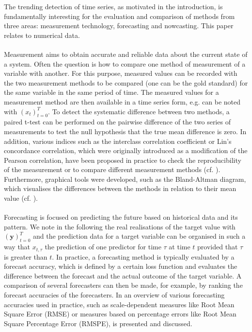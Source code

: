 The trending detection of time series, as motivated in the introduction, is fundamentally interesting for the evaluation and comparison of methods from three areas: measurement technology, forecasting and nowcasting. This paper relates to numerical data.\\\\
Measurement aims to obtain accurate and reliable data about the current state of a system. Often the question is how to compare one method of measurement of a variable with another. For this purpose, measured values can be recorded with the two measurement methods to be compared (one can be the gold standard) for the same variable in the same period of time. The measured values for a measurement method are then available in a time series form, e.g. can be noted with $(x_t)^T_{t=0}$. To detect the systematic difference between two methods, a paired t-test can be performed on the pairwise difference of the two series of measurements to test the null hypothesis that the true mean difference is zero\cite{watson2010method}. In addition, various indices such as the interclass correlation coefficient or Lin's concordance correlation, which were originally introduced as a modification of the Pearson correlation, have been proposed in practice to check the reproducibility of the measurement or to compare different measurement methods (cf. \cite{lawrence1989concordance,koo2016guideline,}). Furthermore, graphical tools were developed, such as the
Bland-Altman diagram, which visualises the differences between the methods in relation to their mean value (cf. \cite{bland1986statistical}). \\\\
Forecasting is focused on predicting the future based on historical data and its pattern. We note in the following the real realisations of the target value with $(\mathbf{y})^T_{t=0}$ and the prediction data for a target variable  can be organised in such a way that $x_{t,\tau}$ the prediction of one predictor for time $\tau$ at time $t$ provided that $\tau$ is greater than $t$. In practice, a forecasting method is typically evaluated by a forecast accuracy, which is defined by a certain loss function and evaluates the difference between the forecast and the actual outcome of the target variable. A comparison of several forecasters can then be made, for example, by ranking the forecast accuracies of the forecasters. In \cite{hyndman2006another} an overview of various forecasting accuracies used in practice, such as scale-dependent measures like Root Mean Square Error (RMSE) or measures based on percentage errors like Root Mean Square Percentage Error (RMSPE), is presented and discussed. \\\\
